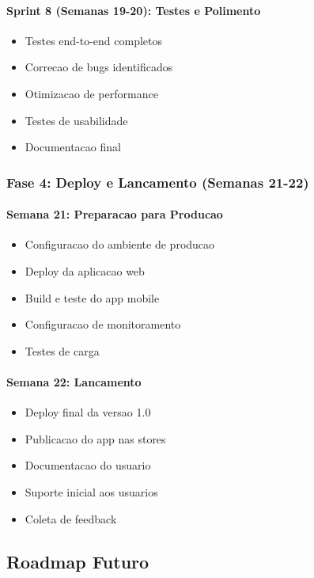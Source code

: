 \paragraph{Sprint 8 (Semanas 19-20): Testes e Polimento}
\begin{itemize}
    \item Testes end-to-end completos
    \item Correcao de bugs identificados
    \item Otimizacao de performance
    \item Testes de usabilidade
    \item Documentacao final
\end{itemize}

\subsubsection{Fase 4: Deploy e Lancamento (Semanas 21-22)}

\paragraph{Semana 21: Preparacao para Producao}
\begin{itemize}
    \item Configuracao do ambiente de producao
    \item Deploy da aplicacao web
    \item Build e teste do app mobile
    \item Configuracao de monitoramento
    \item Testes de carga
\end{itemize}

\paragraph{Semana 22: Lancamento}
\begin{itemize}
    \item Deploy final da versao 1.0
    \item Publicacao do app nas stores
    \item Documentacao do usuario
    \item Suporte inicial aos usuarios
    \item Coleta de feedback
\end{itemize}

\subsection{Roadmap Futuro}

